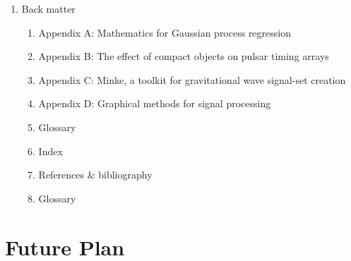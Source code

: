 \documentclass{kentigern}
\theoremstyle{definition}
\begin{document}
\begin{enumerate}
  
  This section will cover the use of hierarchical modelling for the
  measurement of astrophysical quantities from gravitational wave and
  electromagnetic observations. The bulk of this section will be based
  around the work presented in Williams et al. (2018) relating to the
  inference of GRB jet angles from astrophysical rates.

  \begin{enumerate}
  \item Hierarchical inference to infer physical properties from astrophysical rates
  \item Inferring SGRB beaming angles from rate information
  \item Hierarchical modelling for general beamed emission scenarios
  \item Damselfly: A hierarchical model for SGRB astrophysics
  \end{enumerate}
\item Back matter
  \begin{enumerate}
  \item Appendix A: Mathematics for Gaussian process regression
  \item Appendix B: The effect of compact objects on pulsar timing arrays
  \item Appendix C: Minke, a toolkit for gravitational wave signal-set creation
  \item Appendix D: Graphical methods for signal processing
  \item Glossary 
  \item Index
  \item References \& bibliography
  \item Glossary
  \end{enumerate}
\end{enumerate}


\chapter{Future Plan}



\end{document}
